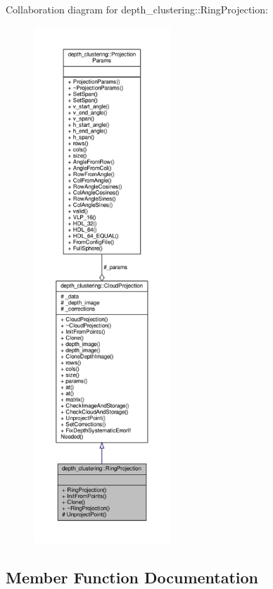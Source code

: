 Collaboration diagram for depth\+\_\+clustering\+:\+:Ring\+Projection\+:\nopagebreak
\begin{figure}[H]
\begin{center}
\leavevmode
\includegraphics[height=550pt]{classdepth__clustering_1_1RingProjection__coll__graph}
\end{center}
\end{figure}


\subsection{Member Function Documentation}
\mbox{\label{classdepth__clustering_1_1RingProjection_a433c0ee114b89b6c78ad4c471d120153}} 
